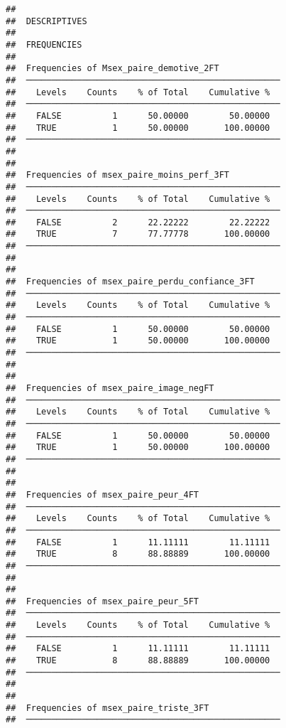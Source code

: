 \documentclass[
]{article}
\begin{document}
\begin{verbatim}
## 
##  DESCRIPTIVES
## 
##  FREQUENCIES
## 
##  Frequencies of Msex_paire_demotive_2FT             
##  ────────────────────────────────────────────────── 
##    Levels    Counts    % of Total    Cumulative %   
##  ────────────────────────────────────────────────── 
##    FALSE          1      50.00000        50.00000   
##    TRUE           1      50.00000       100.00000   
##  ────────────────────────────────────────────────── 
## 
## 
##  Frequencies of msex_paire_moins_perf_3FT           
##  ────────────────────────────────────────────────── 
##    Levels    Counts    % of Total    Cumulative %   
##  ────────────────────────────────────────────────── 
##    FALSE          2      22.22222        22.22222   
##    TRUE           7      77.77778       100.00000   
##  ────────────────────────────────────────────────── 
## 
## 
##  Frequencies of msex_paire_perdu_confiance_3FT      
##  ────────────────────────────────────────────────── 
##    Levels    Counts    % of Total    Cumulative %   
##  ────────────────────────────────────────────────── 
##    FALSE          1      50.00000        50.00000   
##    TRUE           1      50.00000       100.00000   
##  ────────────────────────────────────────────────── 
## 
## 
##  Frequencies of msex_paire_image_negFT              
##  ────────────────────────────────────────────────── 
##    Levels    Counts    % of Total    Cumulative %   
##  ────────────────────────────────────────────────── 
##    FALSE          1      50.00000        50.00000   
##    TRUE           1      50.00000       100.00000   
##  ────────────────────────────────────────────────── 
## 
## 
##  Frequencies of msex_paire_peur_4FT                 
##  ────────────────────────────────────────────────── 
##    Levels    Counts    % of Total    Cumulative %   
##  ────────────────────────────────────────────────── 
##    FALSE          1      11.11111        11.11111   
##    TRUE           8      88.88889       100.00000   
##  ────────────────────────────────────────────────── 
## 
## 
##  Frequencies of msex_paire_peur_5FT                 
##  ────────────────────────────────────────────────── 
##    Levels    Counts    % of Total    Cumulative %   
##  ────────────────────────────────────────────────── 
##    FALSE          1      11.11111        11.11111   
##    TRUE           8      88.88889       100.00000   
##  ────────────────────────────────────────────────── 
## 
## 
##  Frequencies of msex_paire_triste_3FT               
##  ────────────────────────────────────────────────── 

\end{verbatim}
\end{document}
